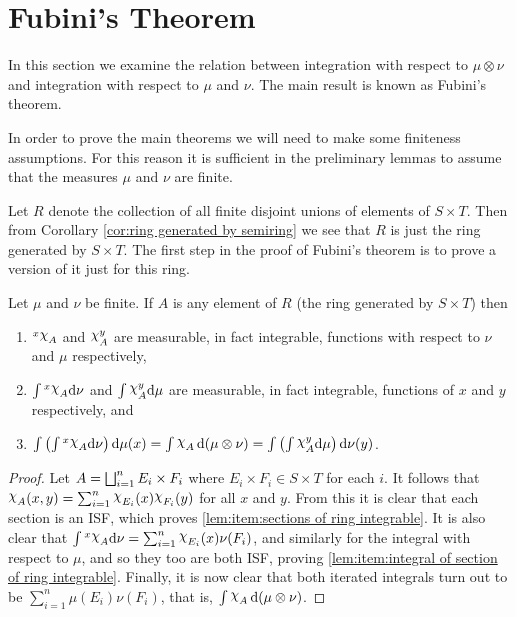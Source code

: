 \section{Fubini's Theorem}

In this section we examine the relation between integration with respect to $\mu\otimes\nu$ and integration with respect to $\mu$ and $\nu$. The main result is known as Fubini's theorem.

In order to prove the main theorems we will need to make some finiteness assumptions. For this reason it is sufficient in the preliminary lemmas to assume that the measures $\mu$ and $\nu$ are finite.

Let $R$ denote the collection of all finite disjoint unions of elements of $S\times T$. Then from Corollary \ref{cor:ring generated by semiring} we see that $R$ is just the ring generated by $S\times T$. The first step in the proof of Fubini's theorem is to prove a version of it just for this ring.

\begin{lemma}\label{lem:fubini finite union}
Let $\mu$ and $\nu$ be finite. If $A$ is any element of $R$ (the ring generated by $S\times T$) then
\begin{enumerate}[label=\arabic*),ref=\arabic*)]
    \item\label{lem:item:sections of ring integrable}
    $\xsec{\idf{A}}{x}$ and $\ysec{\idf{A}}{y}$ are measurable, in fact integrable, functions with respect to $\nu$ and $\mu$ respectively,

    \item\label{lem:item:integral of section of ring integrable}
    $\int\xsec{\idf{A}}{x}\dd\nu$ and $\int\ysec{\idf{A}}{y}\dd\mu$ are measurable, in fact integrable, functions of $x$ and $y$ respectively, and

    \item $\int\br{\int\xsec{\idf{A}}{x}\dd\nu}\dd\mu(x)=\int\idf{A}\dd(\mu\otimes\nu)=\int\br{\int\ysec{\idf{A}}{y}\dd\mu}\dd\nu(y)$.
\end{enumerate}
\end{lemma}

\begin{proof}
Let $A=\bigsqcup_{i=1}^nE_i\times F_i$ where $E_i\times F_i\in S\times T$ for each $i$. It follows that $\idf{A}(x,y)=\sum_{i=1}^n\idf{E_i}(x)\idf{F_i}(y)$ for all $x$ and $y$. From this it is clear that each section is an ISF, which proves \ref{lem:item:sections of ring integrable}. It is also clear that $\int\xsec{\idf{A}}{x}\dd\nu=\sum_{i=1}^n\idf{E_i}(x)\nu(F_i)$, and similarly for the integral with respect to $\mu$, and so they too are both ISF, proving \ref{lem:item:integral of section of ring integrable}. Finally, it is now clear that both iterated integrals turn out to be $\sum_{i=1}^n\mu(E_i)\nu(F_i)$, that is, $\int\idf{A}\dd(\mu\otimes\nu)$.
\end{proof}

